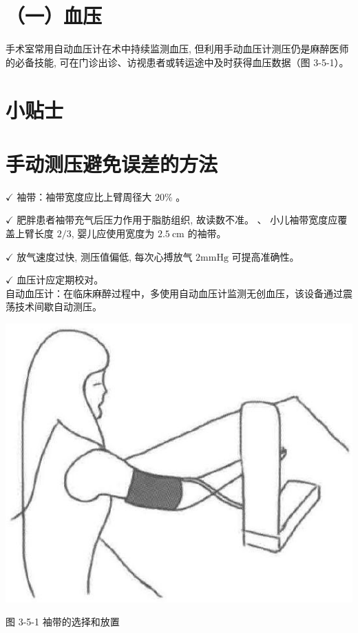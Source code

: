\documentclass[10pt]{article}
\begin{document}
\section*{（一）血压}
手术室常用自动血压计在术中持续监测血压, 但利用手动血压计测压仍是麻醉医师的必备技能, 可在门诊出诊、访视患者或转运途中及时获得血压数据（图 3-5-1）。

\section*{小贴士}
\section*{手动测压避免误差的方法}
$\checkmark$ 袖带：袖带宽度应比上臂周径大 $20 \%$ 。

$\checkmark$ 肥胖患者袖带充气后压力作用于脂肪组织, 故读数不准。 $、$ 小儿袖带宽度应覆盖上臂长度 $2 / 3$, 婴儿应使用宽度为 $2.5 \mathrm{~cm}$ 的袖带。

$\checkmark$ 放气速度过快, 测压值偏低, 每次心搏放气 $2 \mathrm{mmHg}$ 可提高准确性。

$\checkmark$ 血压计应定期校对。\\
自动血压计：在临床麻醉过程中，多使用自动血压计监测无创血压，该设备通过震荡技术间歇自动测压。

\begin{center}
\includegraphics[max width=\textwidth]{2024_07_05_645bb794a4d4f32ee0c8g-095}
\end{center}

图 3-5-1 袖带的选择和放置
\end{document}
